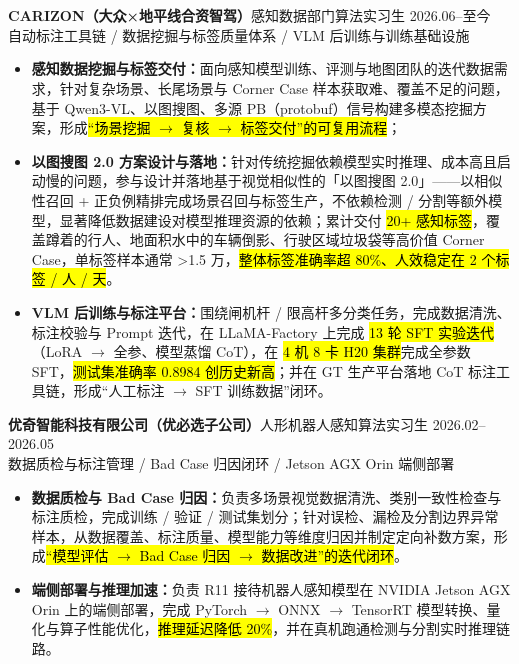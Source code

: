 \section[实习经历]{}
{\small\textbf{CARIZON（大众×地平线合资智驾）}}\quad 感知数据部门算法实习生 \hfill {2026.06--至今}\\
{\scriptsize\color{WHU_Blue} 自动标注工具链 / 数据挖掘与标签质量体系 / VLM 后训练与训练基础设施}
\begin{itemize}
    \item \textbf{感知数据挖掘与标签交付：}面向感知模型训练、评测与地图团队的迭代数据需求，针对复杂场景、长尾场景与 Corner Case 样本获取难、覆盖不足的问题，基于 Qwen3-VL、以图搜图、多源 PB（protobuf）信号构建多模态挖掘方案，形成\hl{“场景挖掘 $\rightarrow$ 复核 $\rightarrow$ 标签交付”的可复用流程}；
    \item \textbf{以图搜图 2.0 方案设计与落地：}针对传统挖掘依赖模型实时推理、成本高且启动慢的问题，参与设计并落地基于视觉相似性的「以图搜图 2.0」——以相似性召回 + 正负例精排完成场景召回与标签生产，不依赖检测 / 分割等额外模型，显著降低数据建设对模型推理资源的依赖；累计交付 \hl{20+ 感知标签}，覆盖蹲着的行人、地面积水中的车辆倒影、行驶区域垃圾袋等高价值 Corner Case，单标签样本通常 >1.5 万，\hl{整体标签准确率超 80\%、人效稳定在 2 个标签 / 人 / 天}。
    \item \textbf{VLM 后训练与标注平台：}围绕闸机杆 / 限高杆多分类任务，完成数据清洗、标注校验与 Prompt 迭代，在 LLaMA-Factory 上完成 \hl{13 轮 SFT 实验迭代}（LoRA $\rightarrow$ 全参、模型蒸馏 CoT），在 \hl{4 机 8 卡 H20 集群}完成全参数 SFT，\hl{测试集准确率 0.8984 创历史新高}；并在 GT 生产平台落地 CoT 标注工具链，形成“人工标注 $\rightarrow$ SFT 训练数据”闭环。
\end{itemize}

\vspace{0.30em}
{\small\textbf{优奇智能科技有限公司（优必选子公司）}}\quad 人形机器人感知算法实习生 \hfill {2026.02--2026.05} \\
{\scriptsize\color{WHU_Blue} 数据质检与标注管理 / Bad Case 归因闭环 / Jetson AGX Orin 端侧部署}
\begin{itemize}
    \item \textbf{数据质检与 Bad Case 归因：}负责多场景视觉数据清洗、类别一致性检查与标注质检，完成训练 / 验证 / 测试集划分；针对误检、漏检及分割边界异常样本，从数据覆盖、标注质量、模型能力等维度归因并制定定向补数方案，形成\hl{“模型评估 $\rightarrow$ Bad Case 归因 $\rightarrow$ 数据改进”的迭代闭环}。
    \item \textbf{端侧部署与推理加速：}负责 R11 接待机器人感知模型在 NVIDIA Jetson AGX Orin 上的端侧部署，完成 PyTorch $\rightarrow$ ONNX $\rightarrow$ TensorRT 模型转换、量化与算子性能优化，\hl{推理延迟降低 20\%}，并在真机跑通检测与分割实时推理链路。
\end{itemize}

